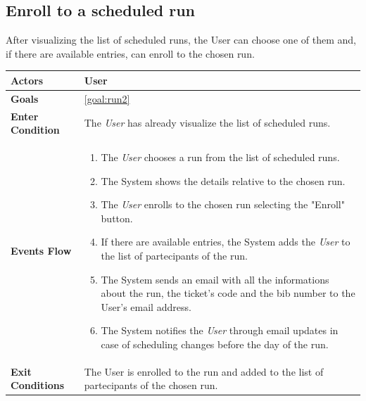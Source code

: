   \subsection{Enroll to a scheduled run}
After visualizing the list of scheduled runs, the User can choose one of them and, if there are available entries, can enroll to the chosen run. 

\begin{table}[H]
	\centering
    
    \begin{tabular}{|p{3.5cm}|p{10.3cm}|}
    
    \hline
    \textbf{\large{Actors}}  			& \tabitem User\\
    				 					
    \hline
    \textbf{\large{Goals}} 				& \ref{goal:run2}\\
    
    \hline
    \textbf{\large{Enter Condition}}	& The \emph{User} has already visualize the list of scheduled runs.\\
    
    \hline
    \textbf{\large{Events Flow}}		& \begin{enumerate}[leftmargin=0.5cm]
                                          	\item The \emph{User} chooses a run from the list of scheduled runs. 
                                          	 \item The System shows the details relative to the chosen run.
                                            \item The \emph{User} enrolls to the chosen run selecting the "Enroll" button.
                                            \item If there are available entries, the System adds the \emph{User} to the list of partecipants of the run.
                                             \item The System sends an email with all the informations about the run, the ticket's code and the bib number to the User's email address.
                                              \item The System notifies the \emph{User} through email updates in case of scheduling changes before the day of the run.
                                             \end{enumerate}
    										\\
    \hline
    \textbf{\large{Exit Conditions}}    & The User is enrolled to the run and added to the list of partecipants of the chosen run.  \\
    

\end{tabular}
\end{table}
